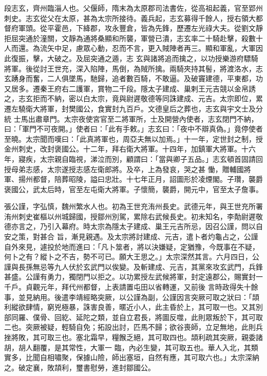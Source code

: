 \begin{pinyinscope}
 段志玄，齊州臨淄人也。父偃師，隋末為太原郡司法書佐，從高祖起義，官至郢州刺史。志玄從父在太原，甚為太宗所接待。義兵起，志玄募得千餘人，授右領大都督府軍頭。從平霍邑，下絳郡，攻永豐倉，皆為先鋒，歷遷左光祿大夫。從劉文靜拒屈突通於潼關，文靜為通將桑顯和所襲，軍營已潰，志玄率二十騎赴擊，殺數十人而還。為流矢中足，慮眾心動，忍而不言，更入賊陣者再三。顯和軍亂，大軍因此復振，擊，大破之。及屈突通之遁，志
 玄與諸將追而擒之，以功授樂游府驃騎將軍。後從討王世充，深入陷陣，馬倒，為賊所擒。兩騎夾持其髻，將渡洛水，志玄踴身而奮，二人俱墜馬，馳歸，追者數百騎，不敢逼。及破竇建德，平東都，功又居多。遷秦王府右二護軍，賞物二千段。隱太子建成、巢剌王元吉競以金帛誘之，志玄拒而不納，密以白太宗，竟與尉遲敬德等同誅建成、元吉。太宗即位，累遷左驍衛大將軍，封樊國公，食實封九百戶。文德皇后之葬也，志玄與宇文士及分統
 士馬出肅章門。太宗夜使宮官至二將軍所，士及開營內使者，志玄閉門不納，曰：「軍門不可夜開。」使者曰：「此有手敕。」志玄曰：「夜中不辯真偽。」竟停使者至曉。太宗聞而嘆曰：「此真將軍也，周亞夫無以加焉。」十一年，定世封之制，授金州刺史，改封褒國公。十二年，拜右衛大將軍。十四年，加鎮軍大將軍。十六年，寢疾，太宗親自臨視，涕泣而別，顧謂曰：「當與卿子五品。」志玄頓首固請回授母弟志感，太宗遂授志感左衛郎將。及卒，上為發哀，哭之甚
 慟，贈輔國將軍、揚州都督，陪葬昭陵，謚曰忠壯。十七年正月，詔圖形於凌煙閣。子瓚，襲爵褒國公，武太后時，官至左屯衛大將軍。子懷簡，襲爵，開元中，官至太子詹事。



 張公謹，字弘慎，魏州繁水人也。初為王世充洧州長史。武德元年，與王世充所署洧州刺史崔樞以州城歸國，授鄒州別駕，累除右武候長史。初未知名，李勣尉遲敬德亦言之，乃引入幕府。時太宗為隱太子建成、巢王元吉所忌，因召公謹，問以自安之策，對甚合
 旨，漸見親遇。及太宗將討建成、元吉，遣卜者灼龜占之，公謹自外來見，遽投於地而進曰：「凡卜筮者，將以決嫌疑，定猶豫，今既事在不疑，何卜之有？縱卜之不吉，勢不可已。願大王思之。」太宗深然其言。六月四日，公謹與長孫無忌等九人伏於玄武門以俟變。及斬建成、元吉，其黨來攻玄武門，兵鋒甚盛。公謹有勇力，獨閉門以拒之。以功累授左武候將軍，封定遠郡公，賜實封一千戶。貞觀元年，拜代州都督，上表請置屯田以省轉運，又前後
 言時政得失十餘事，並見納用。後遣李靖經略突厥，以公謹為副，公謹因言突厥可取之狀曰：「頡利縱欲肆情，窮兇極暴，誅害良善，暱近小人，此主昏於上，其可取一也。又其別部同羅、僕骨、回紇、延陀之類，並自立君長，將圖反噬，此則眾叛於下，其可取二也。突厥被疑，輕騎自免；拓設出討，匹馬不歸；欲谷喪師，立足無地，此則兵挫將敗，其可取三也。塞北霜早，糧餱乏絕，其可取四也。頡利疏其突厥，親委諸胡，胡人翻覆，是其常性，大軍一
 臨，內必生變，其可取五也。華人入北，其類實多，比聞自相嘯聚，保據山險，師出塞垣，自然有應，其可取六也。」太宗深納之。破定襄，敗頡利，璽書慰勞，進封鄒國公。




\end{pinyinscope}
